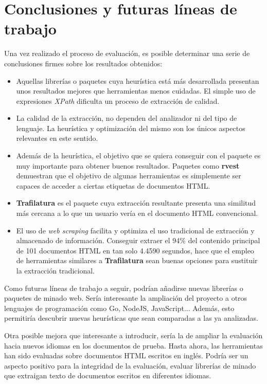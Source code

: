 \chapter{Conclusiones y futuras l\'ineas de trabajo}
\label{cha:conclusiones y futuras lineas de trabajo}

Una vez realizado el proceso de evaluación, es posible determinar una serie de conclusiones firmes sobre
los resultados obtenidos:

\begin{itemize}

    \item Aquellas librerías o paquetes cuya heurística está más desarrollada presentan unos resultados
    mejores que herramientas menos cuidadas. El simple uso de expresiones \emph{XPath} dificulta un proceso
    de extracción de calidad.
    \item La calidad de la extracción, no dependen del analizador ni del tipo de lenguaje. La heurística
    y optimización del mismo son los únicos aspectos relevantes en este sentido.
    \item Además de la heurística, el objetivo que se quiera conseguir con el paquete es muy importante 
    para obtener buenos resultados. Paquetes como \textbf{rvest} demuestran que el objetivo de algunas 
    herramientas es simplemente ser capaces de acceder a ciertas etiquetas de documentos HTML.
    \item \textbf{Trafilatura} es el paquete cuya extracción resultante presenta una similitud más cercana
    a lo que un usuario vería en el documento HTML convencional.
    \item El uso de \emph{web scraping} facilita y optimiza el uso tradicional de extracción y almacenado
    de información. Conseguir extraer el 94\% del contenido principal de 101 documentos HTML en tan solo 
    4.4590 segundos, hace que el empleo de herramientas similares a \textbf{Trafilatura} sean buenas 
    opciones para sustituir la extracción tradicional.

\end{itemize}

Como futuras líneas de trabajo a seguir, podrían añadirse nuevas librerías o paquetes de minado web. Sería
interesante la ampliación del proyecto a otros lenguajes de programación como Go, NodeJS, JavaScript...
Además, esto permitiría descubrir nuevas heurísticas que sean comparadas a las ya analizadas.

Otra posible mejora que interesante a introducir, sería la de ampliar la evaluación hacia nuevos idiomas 
en los documentos de prueba. Hasta ahora, las herramientas han sido evaluadas sobre documentos HTML escritos 
en inglés. Podría ser un aspecto positivo para la integridad de la evaluación, evaluar librerías de minado 
que extraigan texto de documentos escritos en diferentes idiomas.